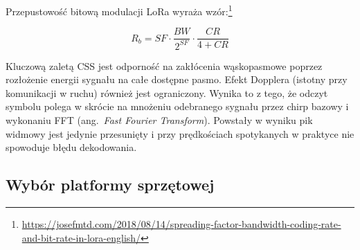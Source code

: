Przepustowość bitową modulacji LoRa wyraża wzór:\footnote{\url{https://josefmtd.com/2018/08/14/spreading-factor-bandwidth-coding-rate-and-bit-rate-in-lora-english/}}

\begin{equation}
    R_b = SF \cdot \frac{BW}{2^{SF}} \cdot \frac{CR}{4+CR}
    \label{eq:lora-bitrate}
\end{equation}

Kluczową zaletą CSS jest odporność na zakłócenia wąskopasmowe poprzez rozłożenie energii sygnału
na całe dostępne pasmo. Efekt Dopplera (istotny przy komunikacji w ruchu) również jest ograniczony.
Wynika to z tego, że odczyt symbolu polega w skrócie na mnożeniu odebranego sygnału przez chirp
bazowy i wykonaniu FFT (ang.\ \textit{Fast Fourier Transform}). Powstały w wyniku pik widmowy jest
jedynie przesunięty i przy prędkościach spotykanych w praktyce nie spowoduje błędu dekodowania.

\subsection*{Wybór platformy sprzętowej}

